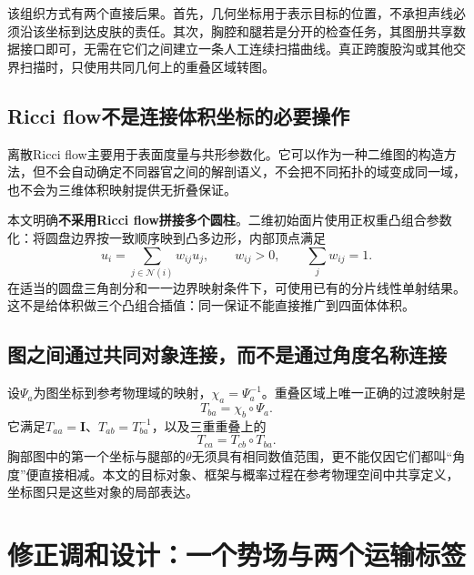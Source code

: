 \documentclass[UTF8,11pt,a4paper,fontset=fandol]{ctexart}
\numberwithin{equation}{section}
\theoremstyle{plain}
\theoremstyle{definition}
\theoremstyle{remark}
\newcommand{\Id}{\mathbf I}\newcommand{\T}{^{\mathsf T}}
\begin{document}
该组织方式有两个直接后果。首先，几何坐标用于表示目标的位置，不承担声线必须沿该坐标到达皮肤的责任。其次，胸腔和腿若是分开的检查任务，其图册共享数据接口即可，无需在它们之间建立一条人工连续扫描曲线。真正跨腹股沟或其他交界扫描时，只使用共同几何上的重叠区域转图。

\subsection{Ricci flow不是连接体积坐标的必要操作}
离散Ricci flow主要用于表面度量与共形参数化\cite{Jin2008}。它可以作为一种二维图的构造方法，但不会自动确定不同器官之间的解剖语义，不会把不同拓扑的域变成同一域，也不会为三维体积映射提供无折叠保证。

本文明确\textbf{不采用Ricci flow拼接多个圆柱}。二维初始面片使用正权重凸组合参数化：将圆盘边界按一致顺序映到凸多边形，内部顶点满足
\begin{equation}
 u_i=\sum_{j\in\mathcal N(i)}w_{ij}u_j,
 \qquad w_{ij}>0,\qquad \sum_jw_{ij}=1.
 \label{eq:surface-barycentric}
\end{equation}
在适当的圆盘三角剖分和一一边界映射条件下，可使用已有的分片线性单射结果\cite{Floater2003,Floater2006}。这不是给体积做三个凸组合插值：同一保证不能直接推广到四面体体积。

\subsection{图之间通过共同对象连接，而不是通过角度名称连接}
设$\Psi_a$为图坐标到参考物理域的映射，$\chi_a=\Psi_a^{-1}$。重叠区域上唯一正确的过渡映射是
\begin{equation}
 T_{ba}=\chi_b\circ\Psi_a.
 \label{eq:chart-transition}
\end{equation}
它满足$T_{aa}=\Id$、$T_{ab}=T_{ba}^{-1}$，以及三重重叠上的
\begin{equation}
 T_{ca}=T_{cb}\circ T_{ba}.
 \label{eq:cocycle}
\end{equation}
胸部图中的第一个坐标与腿部的$\theta$无须具有相同数值范围，更不能仅因它们都叫“角度”便直接相减。本文的目标对象、框架与概率过程在参考物理空间中共享定义，坐标图只是这些对象的局部表达。

\section{修正调和设计：一个势场与两个运输标签}\label{sec:harmonic}
\end{document}
